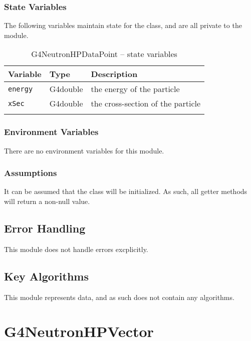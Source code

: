 \documentclass[12pt]{article}
\begin{document}
\subsubsection{State Variables}%
The following variables maintain state for the class, and are all private to the module.

\begin{table}[h]
\caption{G4NeutronHPDataPoint -- state variables}\label{Table_NeutronHPDataPointStateVariables}
\begin{tabularx}{\textwidth}{llX}
\toprule
\bf Variable & \bf Type & \bf Description\\\midrule
\arrayrulecolor{lightgray}
\texttt{energy} & G4double & the energy of the particle \\\hline
\texttt{xSec}   & G4double & the cross-section of the particle \\
\arrayrulecolor{black}
\bottomrule
\end{tabularx}
\end{table}

\subsubsection{Environment Variables}%
There are no environment variables for this module.

\subsubsection{Assumptions}%
It can be assumed that the class will be initialized. As such, all getter methods will return a non-null value.

\subsection{Error Handling}
This module does not handle errors excplicitly.

\subsection{Key Algorithms}
This module represents data, and as such does not contain any algorithms.



\section{G4NeutronHPVector}
\end{document}
